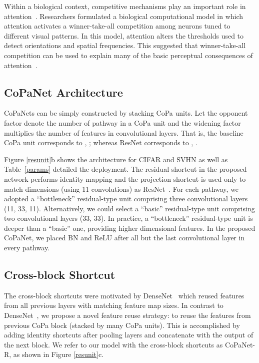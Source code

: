 \documentclass[wcp]{jmlr}
\begin{document}
Within a biological context, competitive mechanisms play an important role in attention~\citep{lee1999attention}. 
Researchers formulated a biological computational model in which attention activates a winner-take-all competition among neurons tuned to different visual patterns. 
In this model, attention alters the thresholds used to detect orientations and spatial frequencies. 
This suggested that winner-take-all competition can be used to explain many of the basic perceptual consequences of attention~\citep{lee1999attention}.

\subsection{CoPaNet Architecture}
CoPaNets can be simply constructed by stacking CoPa units. 
Let the opponent factor  denote the number of pathway in a CoPa unit and the widening factor  multiplies the number of features in convolutional layers.
That is, the baseline CoPa unit corresponds to , ; whereas ResNet corresponds to , .

Figure \ref{resunit}b shows the architecture for CIFAR and SVHN as well as Table~\ref{params} detailed the deployment.
The residual shortcut in the proposed network performs identity mapping and the projection shortcut is used only to match dimensions (using 11 convolutions) as ResNet~\citep{he2015deep,he2016identity}. 
For each pathway, we adopted a ``bottleneck'' residual-type unit comprising three convolutional layers (11, 33, 11). 
Alternatively, we could select a ``basic'' residual-type unit comprising two convolutional layers (33, 33). 
In practice, a ``bottleneck'' residual-type unit is deeper than a ``basic'' one, providing higher dimensional features. 
In the proposed CoPaNet, we placed BN and ReLU after all but the last convolutional layer in every pathway. 

\subsection{Cross-block Shortcut}
The cross-block shortcuts were motivated by DenseNet~\citep{huang2016densely} which reused features from all previous layers with matching feature map sizes.
In contrast to DenseNet~\citep{huang2016densely}, we propose a novel feature reuse strategy: to reuse the features from previous CoPa block (stacked by many CoPa units).
This is accomplished by adding identity shortcuts after pooling layers and concatenate with the output of the next block.
We refer to our model with the cross-block shortcuts as CoPaNet-R, as shown in Figure \ref{resunit}c.
\end{document}
